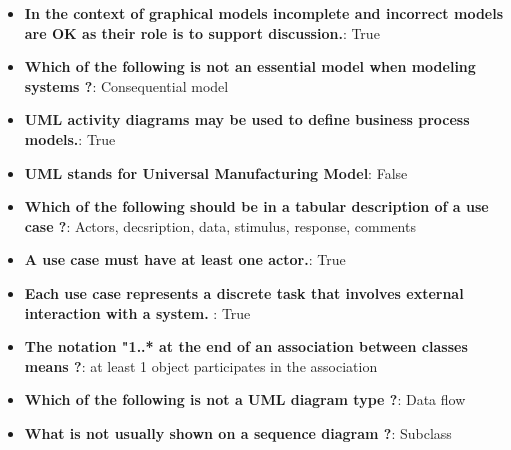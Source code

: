 \documentclass{report}
\begin{document}
    \pagebreak 
    \begin{itemize}
        \item \textbf{In the context of graphical models incomplete and incorrect models are OK as their role is to support discussion.}: True
        \item \textbf{Which of the following is not an essential model when modeling systems ?}: Consequential model
        \item \textbf{UML activity diagrams may be used to define business process models.}: True
        \item \textbf{UML stands for Universal Manufacturing Model}: False
        \item \textbf{Which of the following should be in a tabular description of a use case ?}: Actors, decsription, data, stimulus, response, comments
        \item \textbf{A use case must have at least one actor.}: True
        \item \textbf{Each use case represents a discrete task that involves external interaction with a system. }: True
        \item \textbf{The notation "1..* at the end of an association between classes means ?}: at least 1 object participates in the association
        \item \textbf{Which of the following is not a UML diagram type ?}: Data flow
        \item \textbf{What is not usually shown on a sequence diagram ?}: Subclass
    \end{itemize}
\end{document}
